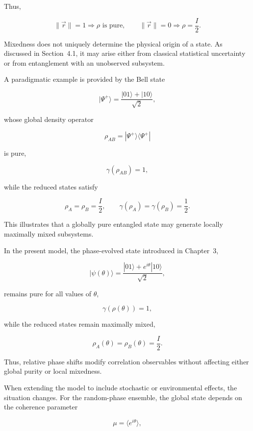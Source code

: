 Thus,

\[
\|\vec{r}\| = 1
\Rightarrow
\rho \text{ is pure},
\qquad
\|\vec{r}\| = 0
\Rightarrow
\rho = \frac{I}{2}.
\]

\medskip

Mixedness does not uniquely determine the physical origin of a state. As discussed in Section~4.1, it may arise either from classical statistical uncertainty or from entanglement with an unobserved subsystem.

\medskip

A paradigmatic example is provided by the Bell state

\[
|\Psi^+\rangle
=
\frac{|01\rangle + |10\rangle}{\sqrt{2}},
\]

whose global density operator

\[
\rho_{AB}
=
|\Psi^+\rangle\langle\Psi^+|
\]

is pure,

\[
\gamma(\rho_{AB}) = 1,
\]

while the reduced states satisfy

\[
\rho_A
=
\rho_B
=
\frac{I}{2},
\qquad
\gamma(\rho_A)
=
\gamma(\rho_B)
=
\frac{1}{2}.
\]

This illustrates that a globally pure entangled state may generate locally maximally mixed subsystems.

\medskip

In the present model, the phase-evolved state introduced in Chapter~3,

\[
|\psi(\theta)\rangle
=
\frac{|01\rangle + e^{i\theta}|10\rangle}{\sqrt{2}},
\]

remains pure for all values of \( \theta \),

\begin{equation}
\gamma(\rho(\theta)) = 1,
\label{eq:phase_state_global_purity}
\end{equation}

while the reduced states remain maximally mixed,

\[
\rho_A(\theta)
=
\rho_B(\theta)
=
\frac{I}{2}.
\]

Thus, relative phase shifts modify correlation observables without affecting either global purity or local mixedness.

\medskip

When extending the model to include stochastic or environmental effects, the situation changes. For the random-phase ensemble, the global state depends on the coherence parameter

\begin{equation}
\mu
=
\langle e^{i\theta} \rangle,
\label{eq:coherence_parameter_mu}
\end{equation}

